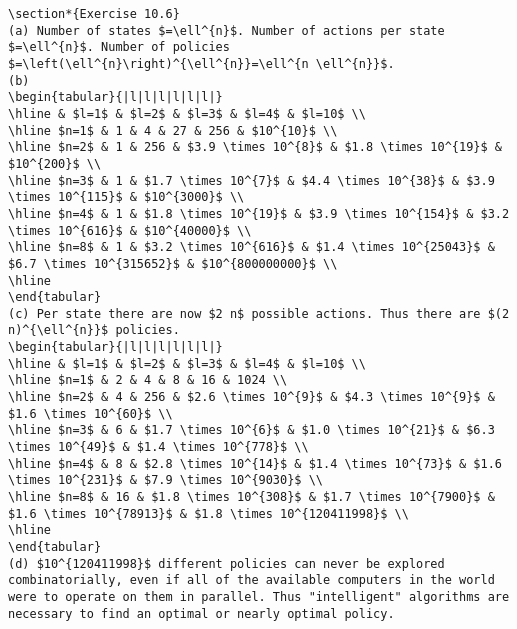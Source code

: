 \documentclass[10pt]{article}
\begin{document}
\begin{verbatim}
\section*{Exercise 10.6}
(a) Number of states $=\ell^{n}$. Number of actions per state $=\ell^{n}$. Number of policies $=\left(\ell^{n}\right)^{\ell^{n}}=\ell^{n \ell^{n}}$.
(b)
\begin{tabular}{|l|l|l|l|l|l|}
\hline & $l=1$ & $l=2$ & $l=3$ & $l=4$ & $l=10$ \\
\hline $n=1$ & 1 & 4 & 27 & 256 & $10^{10}$ \\
\hline $n=2$ & 1 & 256 & $3.9 \times 10^{8}$ & $1.8 \times 10^{19}$ & $10^{200}$ \\
\hline $n=3$ & 1 & $1.7 \times 10^{7}$ & $4.4 \times 10^{38}$ & $3.9 \times 10^{115}$ & $10^{3000}$ \\
\hline $n=4$ & 1 & $1.8 \times 10^{19}$ & $3.9 \times 10^{154}$ & $3.2 \times 10^{616}$ & $10^{40000}$ \\
\hline $n=8$ & 1 & $3.2 \times 10^{616}$ & $1.4 \times 10^{25043}$ & $6.7 \times 10^{315652}$ & $10^{800000000}$ \\
\hline
\end{tabular}
(c) Per state there are now $2 n$ possible actions. Thus there are $(2 n)^{\ell^{n}}$ policies.
\begin{tabular}{|l|l|l|l|l|l|}
\hline & $l=1$ & $l=2$ & $l=3$ & $l=4$ & $l=10$ \\
\hline $n=1$ & 2 & 4 & 8 & 16 & 1024 \\
\hline $n=2$ & 4 & 256 & $2.6 \times 10^{9}$ & $4.3 \times 10^{9}$ & $1.6 \times 10^{60}$ \\
\hline $n=3$ & 6 & $1.7 \times 10^{6}$ & $1.0 \times 10^{21}$ & $6.3 \times 10^{49}$ & $1.4 \times 10^{778}$ \\
\hline $n=4$ & 8 & $2.8 \times 10^{14}$ & $1.4 \times 10^{73}$ & $1.6 \times 10^{231}$ & $7.9 \times 10^{9030}$ \\
\hline $n=8$ & 16 & $1.8 \times 10^{308}$ & $1.7 \times 10^{7900}$ & $1.6 \times 10^{78913}$ & $1.8 \times 10^{120411998}$ \\
\hline
\end{tabular}
(d) $10^{120411998}$ different policies can never be explored combinatorially, even if all of the available computers in the world were to operate on them in parallel. Thus "intelligent" algorithms are necessary to find an optimal or nearly optimal policy.


\end{verbatim}
\end{document}
